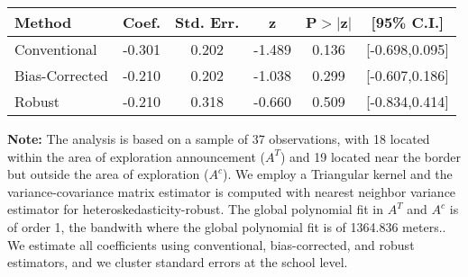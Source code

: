 \begin{table}[htbp]\centering
 \footnotesize 
\begin{tabular}{lccccc}
\hline\hline
Method & Coef. & Std. Err. & z & P$>|$z$|$ & [95\% C.I.] \\ 
\hline \hline  
Conventional & -0.301 & 0.202 & -1.489 & 0.136 & [-0.698,0.095] \\ 
 Bias-Corrected & -0.210 & 0.202 & -1.038 & 0.299 & [-0.607,0.186] \\ 
Robust & -0.210 & 0.318 & -0.660 & 0.509 & [-0.834,0.414] \\ 
  \hline\hline
\end{tabular}
\label{table:rd}
\begin{tablenotes} 
  \justifying \tiny \textbf{Note: }    
   The analysis is based on a sample of 37 observations, with 18 located within the area of exploration announcement ($A^{T}$) and 19 located near the border but outside the area of exploration  ($A^{c}$). 
           We employ a Triangular kernel and the variance-covariance matrix estimator is computed with nearest neighbor variance estimator for heteroskedasticity-robust. The global polynomial fit in  $A^{T}$ and $A^{c}$ is of order 1, the bandwith where the global polynomial fit is of 1364.836 meters.. We estimate all coefficients using conventional, bias-corrected, and robust estimators, and we cluster standard errors at the school level. \end{tablenotes} 
 \end{table} 
